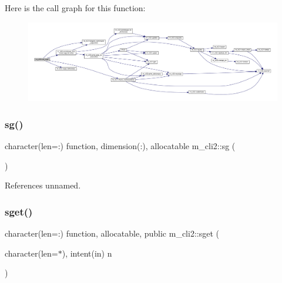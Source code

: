 Here is the call graph for this function\+:
\nopagebreak
\begin{figure}[H]
\begin{center}
\leavevmode
\includegraphics[width=350pt]{namespacem__cli2_a54449bc83be4ddc46746a6a33b590c40_cgraph}
\end{center}
\end{figure}
\mbox{\label{namespacem__cli2_abc94b8f97a6056ea48ce48ab460bdf78}} 
\subsubsection{\texorpdfstring{sg()}{sg()}}
{\footnotesize\ttfamily character(len=\+:) function, dimension(\+:), allocatable m\+\_\+cli2\+::sg (\begin{DoxyParamCaption}{ }\end{DoxyParamCaption})\hspace{0.3cm}{\ttfamily [private]}}



References unnamed.

\mbox{\label{namespacem__cli2_afb7e36674c50a0839bd4eae8301efefc}} 
\subsubsection{\texorpdfstring{sget()}{sget()}}
{\footnotesize\ttfamily character(len=\+:) function, allocatable, public m\+\_\+cli2\+::sget (\begin{DoxyParamCaption}\item[{character(len=$\ast$), intent(in)}]{n }\end{DoxyParamCaption})}

\mbox{\label{namespacem__cli2_aa4eb8a68238351ba1893f9ce555f5c49}} 
